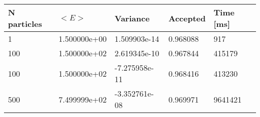 \begin{table}[h!]
\begin{tabular}{|l|l|l|l|l|}
\hline 
N particles & $<E>$ & Variance & Accepted & Time [ms]\\ 
 \hline 
1 & 1.500000e+00 & 1.509903e-14 & 0.968088 & 917 \\ \hline 
100 & 1.500000e+02 & 2.619345e-10 & 0.967844 & 415179 \\ \hline 
100 & 1.500000e+02 & -7.275958e-11 & 0.968416 & 413230 \\ \hline 
500 & 7.499999e+02 & -3.352761e-08 & 0.969971 & 9641421 \\ \hline 
\end{tabular}
\label{h:n3} 
\end{table}
